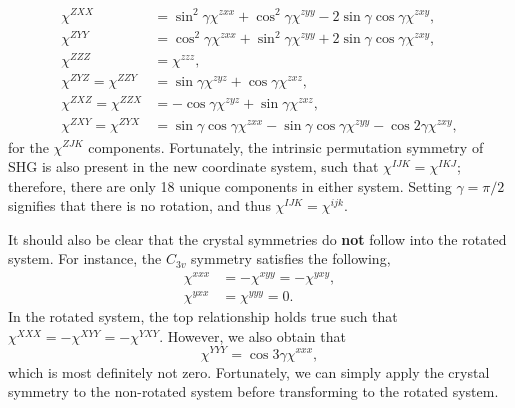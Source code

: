 \documentclass[aps,prb,10pt,letterpaper,notitlepage]{revtex4-1}
\begin{document}
\begin{equation*}
\begin{split}
\chi^{ZXX}
&=  \sin^{2}\gamma        \chi^{zxx}
 +  \cos^{2}\gamma        \chi^{zyy}
 - 2\sin\gamma \cos\gamma \chi^{zxy},\\[10pt]
\chi^{ZYY}
&=  \cos^{2}\gamma        \chi^{zxx}
 +  \sin^{2}\gamma        \chi^{zyy}
 + 2\sin\gamma \cos\gamma \chi^{zxy},\\[10pt]
\chi^{ZZZ} &=  \chi^{zzz},\\[10pt]
\chi^{ZYZ} = \chi^{ZZY}
&= \sin\gamma \chi^{zyz}
 + \cos\gamma \chi^{zxz},\\[10pt]
\chi^{ZXZ} = \chi^{ZZX}
&= 
- \cos\gamma \chi^{zyz}
+ \sin\gamma \chi^{zxz},\\[10pt]
\chi^{ZXY} = \chi^{ZYX}
&= \sin\gamma \cos\gamma \chi^{zxx}
 - \sin\gamma \cos\gamma \chi^{zyy}
 - \cos2\gamma         \chi^{zxy},
\end{split}
\end{equation*}
for the $\chi^{ZJK}$ components. Fortunately, the intrinsic permutation symmetry
of SHG is also present in the new coordinate system, such that $\chi^{IJK} =
\chi^{IKJ}$; therefore, there are only 18 unique components in either system.
Setting $\gamma = \pi/2$ signifies that there is no rotation, and thus $\chi^{IJK}
= \chi^{ijk}$.

It should also be clear that the crystal symmetries do \textbf{not} follow into
the rotated system. For instance, the $C_{3v}$ symmetry satisfies the following,
\begin{equation*}
\begin{split}
\chi^{xxx} &= -\chi^{xyy} = - \chi^{yxy},\\
\chi^{yxx} &= \chi^{yyy} = 0.
\end{split}
\end{equation*}
In the rotated system, the top relationship holds true such that $\chi^{XXX} =
-\chi^{XYY} = - \chi^{YXY}$. However, we also obtain that
\begin{equation*}
\chi^{YYY} = \cos3\gamma \chi^{xxx},
\end{equation*}
which is most definitely not zero. Fortunately, we can simply apply the crystal
symmetry to the non-rotated system before transforming to the rotated system.
\end{document}
